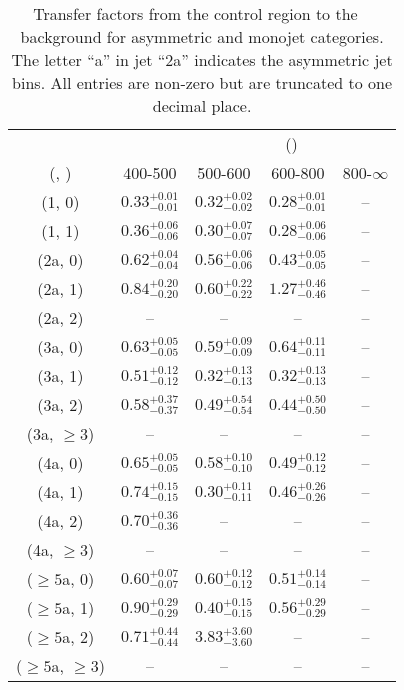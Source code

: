 \begin{table}[h!]
\tiny
\centering
\caption{Transfer factors from the \gj control region to the \zInv~ background for asymmetric and monojet categories. The letter ``a'' in jet \eg ``2a''  indicates the asymmetric jet bins. All entries are non-zero but are truncated to one decimal place.\label{tab:tf_gj_zinv_asym}}
\begin{tabular}
{ccccc}
	\hline\hline
&	& \multicolumn{4}{c}{\scalht (\gev)} \\ 
	 (\njet,  \nb) & 400-500 & 500-600 & 600-800 & 800-$\infty$ \\ [0.8ex] 
\hline
	(1, 0) & $0.33^{+ 0.01 }_{- 0.01 }$ & $0.32^{+ 0.02 }_{- 0.02 }$ & $0.28^{+ 0.01 }_{- 0.01 }$ & -- \\[0.5ex] 
	(1, 1) & $0.36^{+ 0.06 }_{- 0.06 }$ & $0.30^{+ 0.07 }_{- 0.07 }$ & $0.28^{+ 0.06 }_{- 0.06 }$ & -- \\[0.5ex] 
	(2a, 0) & $0.62^{+ 0.04 }_{- 0.04 }$ & $0.56^{+ 0.06 }_{- 0.06 }$ & $0.43^{+ 0.05 }_{- 0.05 }$ & -- \\[0.5ex] 
	(2a, 1) & $0.84^{+ 0.20 }_{- 0.20 }$ & $0.60^{+ 0.22 }_{- 0.22 }$ & $1.27^{+ 0.46 }_{- 0.46 }$ & -- \\[0.5ex] 
	(2a, 2) & -- & -- & -- & -- \\[0.5ex] 
	(3a, 0) & $0.63^{+ 0.05 }_{- 0.05 }$ & $0.59^{+ 0.09 }_{- 0.09 }$ & $0.64^{+ 0.11 }_{- 0.11 }$ & -- \\[0.5ex] 
	(3a, 1) & $0.51^{+ 0.12 }_{- 0.12 }$ & $0.32^{+ 0.13 }_{- 0.13 }$ & $0.32^{+ 0.13 }_{- 0.13 }$ & -- \\[0.5ex] 
	(3a, 2) & $0.58^{+ 0.37 }_{- 0.37 }$ & $0.49^{+ 0.54 }_{- 0.54 }$ & $0.44^{+ 0.50 }_{- 0.50 }$ & -- \\[0.5ex] 
	(3a, $\ge3$) & -- & -- & -- & -- \\[0.5ex] 
	(4a, 0) & $0.65^{+ 0.05 }_{- 0.05 }$ & $0.58^{+ 0.10 }_{- 0.10 }$ & $0.49^{+ 0.12 }_{- 0.12 }$ & -- \\[0.5ex] 
	(4a, 1) & $0.74^{+ 0.15 }_{- 0.15 }$ & $0.30^{+ 0.11 }_{- 0.11 }$ & $0.46^{+ 0.26 }_{- 0.26 }$ & -- \\[0.5ex] 
	(4a, 2) & $0.70^{+ 0.36 }_{- 0.36 }$ & -- & -- & -- \\[0.5ex] 
	(4a, $\ge3$) & -- & -- & -- & -- \\[0.5ex] 
	($\ge5$a, 0) & $0.60^{+ 0.07 }_{- 0.07 }$ & $0.60^{+ 0.12 }_{- 0.12 }$ & $0.51^{+ 0.14 }_{- 0.14 }$ & -- \\[0.5ex] 
	($\ge5$a, 1) & $0.90^{+ 0.29 }_{- 0.29 }$ & $0.40^{+ 0.15 }_{- 0.15 }$ & $0.56^{+ 0.29 }_{- 0.29 }$ & -- \\[0.5ex] 
	($\ge5$a, 2) & $0.71^{+ 0.44 }_{- 0.44 }$ & $3.83^{+ 3.60 }_{- 3.60 }$ & -- & -- \\[0.5ex] 
	($\ge5$a, $\ge3$) & -- & -- & -- & -- \\[0.5ex] 
	\hline
	\hline
\end{tabular}
\end{table}
